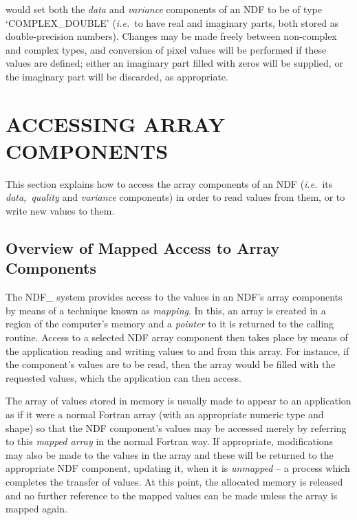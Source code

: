 \documentclass[twoside,11pt,nolof]{starlink}
\providecommand{\st}[1]{{\emph{#1}}}
\begin{document}
would set both the \st{data\/} and \st{variance\/} components of an NDF to be
of type `COMPLEX\_DOUBLE' (\st{i.e.}\ to have real and imaginary parts, both
stored as double-precision numbers).
Changes may be made freely between non-complex and complex types, and
conversion of pixel values will be performed if these values are defined;
either an imaginary part filled with zeros will be supplied, or the
imaginary part will be discarded, as appropriate.


\section{\label{ss:accessingarraycomponents}ACCESSING ARRAY COMPONENTS}

This section explains how to access the array components of an NDF
(\st{i.e.}\ its \st{data,}\ \st{quality\/} and \st{variance\/}
components) in
order to read values from them, or to write new values to them.

\subsection{Overview of Mapped Access to Array Components}

The NDF\_ system provides access to the values in an NDF's array
components by means of a technique known as \st{mapping}.  In this,
an array is created in a region of the computer's memory and a
\st{pointer\/} to it is returned to the calling routine.  Access to a
selected NDF array component then takes place by means of the
application reading and writing values to and from this array.  For
instance, if the component's values are to be read, then the array
would be filled with the requested values, which the application can
then access.

The array of values stored in memory is usually made to appear to an
application as if it were a normal Fortran array (with an appropriate
numeric type and shape) so that the NDF component's values may be accessed
merely by referring to this \st{mapped array\/} in the normal Fortran way. If
appropriate, modifications may also be made to the values in the array and
these will be returned to the appropriate NDF component, updating it, when
it is \st{unmapped\/} -- a process which completes the transfer of values. At
this point, the allocated memory is released and no further reference to
the mapped values can be made unless the array is mapped again.
\end{document}
